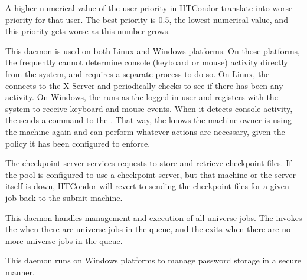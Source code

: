 \begin{description}
\Note A higher numerical value of the user priority in HTCondor
translate into worse priority for that user.  The best priority 
is 0.5, the lowest numerical value, and this priority gets
worse as this number grows.

\item[\Condor{kbdd}] This daemon
is used on both Linux and Windows platforms.
On those platforms, the  frequently cannot determine
console (keyboard or mouse) activity directly from the system, and
requires a separate process to do so.
On Linux, the
 connects to the X Server and periodically checks to see
if there has been any activity.
On Windows, the  runs as the logged-in user and registers
with the system to receive keyboard and mouse events.
When it detects console activity, the  sends a
command to the .  
That way, the  knows the machine owner
is using the machine again and can perform whatever actions are
necessary, given the policy it has been configured to enforce.

\item[\Condor{ckpt\_server}] The checkpoint server
services requests to store and retrieve checkpoint files.  
If the pool is configured to use a checkpoint server,
but that machine or the server itself is down,
HTCondor will revert to sending the checkpoint
files for a given job back to the submit machine.

\item[\Condor{gridmanager}] This daemon
handles management and execution of all 
universe jobs.
The  invokes the  when
there are  universe jobs in the queue,
and the  exits when there are no more
 universe jobs in the queue.

\item[\Condor{credd}] This daemon
runs on Windows platforms to manage password storage in a secure manner.


\end{description}
